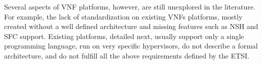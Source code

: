 






Several aspects of VNF platforms, however, are still unexplored in the literature. For example, the lack of standardization on existing VNFs platforms, mostly created without a well defined architecture and missing features such as NSH and SFC support. Existing platforms, detailed next, usually support only a single programming language, run on very specific hypervisors, do not describe a formal architecture, and do not fulfill all the above requirements defined by the ETSI.


